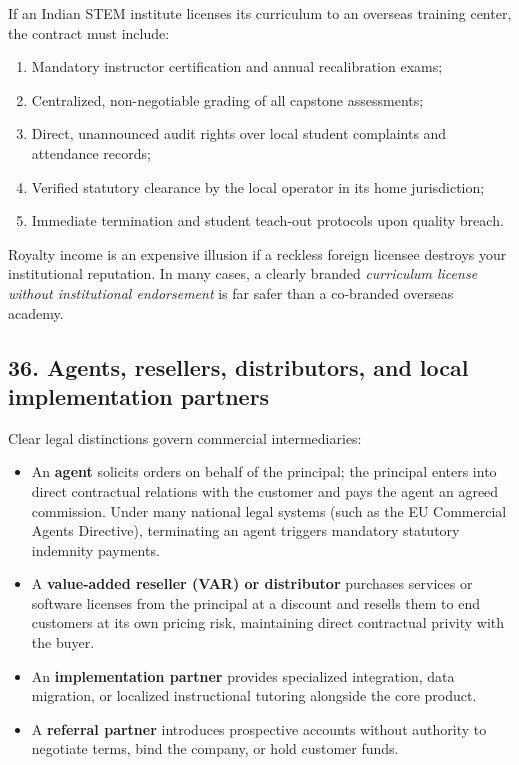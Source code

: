 If an Indian STEM institute licenses its curriculum to an overseas training center, the contract must include:
\begin{enumerate}
    \item Mandatory instructor certification and annual recalibration exams;
    \item Centralized, non-negotiable grading of all capstone assessments;
    \item Direct, unannounced audit rights over local student complaints and attendance records;
    \item Verified statutory clearance by the local operator in its home jurisdiction;
    \item Immediate termination and student teach-out protocols upon quality breach.
\end{enumerate}
Royalty income is an expensive illusion if a reckless foreign licensee destroys your institutional reputation. In many cases, a clearly branded \textit{curriculum license without institutional endorsement} is far safer than a co-branded overseas academy.

\subsection{36. Agents, resellers, distributors, and local implementation partners}

Clear legal distinctions govern commercial intermediaries:
\begin{itemize}
    \item An \textbf{agent} solicits orders on behalf of the principal; the principal enters into direct contractual relations with the customer and pays the agent an agreed commission. Under many national legal systems (such as the EU Commercial Agents Directive), terminating an agent triggers mandatory statutory indemnity payments.
    \item A \textbf{value-added reseller (VAR) or distributor} purchases services or software licenses from the principal at a discount and resells them to end customers at its own pricing risk, maintaining direct contractual privity with the buyer.
    \item An \textbf{implementation partner} provides specialized integration, data migration, or localized instructional tutoring alongside the core product.
    \item A \textbf{referral partner} introduces prospective accounts without authority to negotiate terms, bind the company, or hold customer funds.
\end{itemize}

